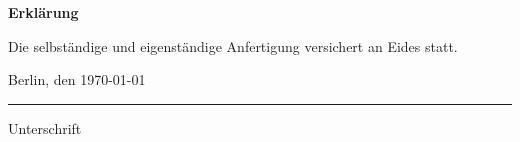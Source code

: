 \thispagestyle{empty}													%
\begin{LARGE}
	\textbf{Erklärung}
\end{LARGE}

\vspace{1cm}

Die selbständige und eigenständige Anfertigung versichert an Eides statt.
\vspace{2cm}

Berlin, den \today

\vspace{1cm}

\rule{0.3\textwidth}{0.4pt}

Unterschrift

\vspace*{6cm}


